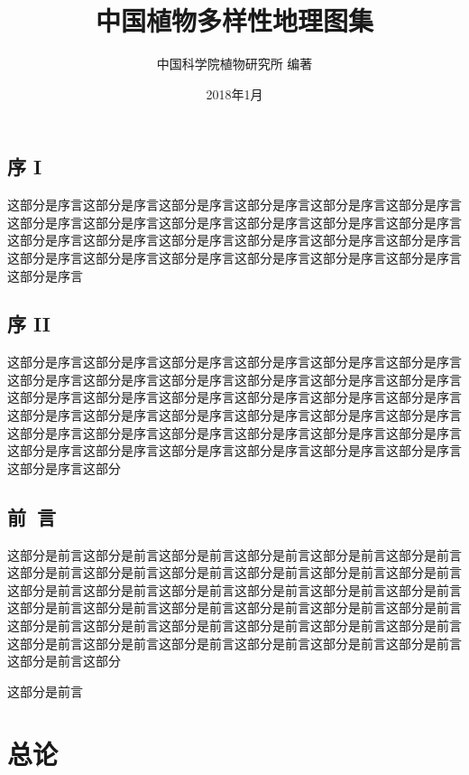 \documentclass[utf8]{book}
\begin{document}
\title{\heiti 中国植物多样性地理图集}
\author{\fangsong 中国科学院植物研究所 编著}
\date{2018年1月}

\frontmatter
\maketitle

\chapter{序 I}

这部分是序言这部分是序言这部分是序言这部分是序言这部分是序言这部分是序言这部分是序言这部分是序言这部分是序言这部分是序言这部分是序言这部分是序言这部分是序言这部分是序言这部分是序言这部分是序言这部分是序言这部分是序言这部分是序言这部分是序言这部分是序言这部分是序言这部分是序言这部分是序言这部分是序言

\chapter{序 II}

这部分是序言这部分是序言这部分是序言这部分是序言这部分是序言这部分是序言这部分是序言这部分是序言这部分是序言这部分是序言这部分是序言这部分是序言这部分是序言这部分是序言这部分是序言这部分是序言这部分是序言这部分是序言这部分是序言这部分是序言这部分是序言这部分是序言这部分是序言这部分是序言这部分是序言这部分是序言这部分是序言这部分是序言这部分是序言这部分是序言这部分是序言这部分是序言这部分是序言这部分是序言这部分是序言这部分是序言这部分是序言这部分

\chapter{前~言}

这部分是前言这部分是前言这部分是前言这部分是前言这部分是前言这部分是前言这部分是前言这部分是前言这部分是前言这部分是前言这部分是前言这部分是前言这部分是前言这部分是前言这部分是前言这部分是前言这部分是前言这部分是前言这部分是前言这部分是前言这部分是前言这部分是前言这部分是前言这部分是前言这部分是前言这部分是前言这部分是前言这部分是前言这部分是前言这部分是前言这部分是前言这部分是前言这部分是前言这部分是前言这部分是前言这部分是前言这部分是前言这部分

这部分是前言

\renewcommand\contentsname{目~录}
\tableofcontents

\mainmatter

\part{总论}
\end{document}
